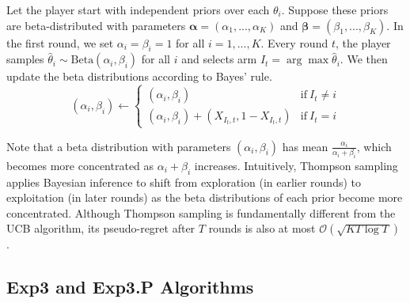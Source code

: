 \documentclass[12pt]{article}
\begin{document}
Let the player start with independent priors over each $\theta_{i}$. Suppose these priors are beta-distributed with parameters $\boldsymbol{\alpha}=(\alpha_{1}, ..., \alpha_{K})$ and $\boldsymbol{\beta}=(\beta_{1}, ..., \beta_{K})$. In the first round, we set $\alpha_{i}=\beta_{i}=1$ for all $i=1,...,K$. Every round $t$, the player samples $\hat{\theta}_{i}\sim\text{Beta}(\alpha_{i},\beta_{i})$ for all $i$ and selects arm $I_{t}=\arg\max\hat{\theta}_{i}$. We then update the beta distributions according to Bayes' rule.
\begin{equation}
(\alpha_{i}, \beta_{i})\leftarrow
\begin{cases}
(\alpha_{i},\beta_{i})&\text{if}\ I_{t}\neq i \\
(\alpha_{i},\beta_{i})+(X_{I_{t},t},1-X_{I_{t},t})&\text{if}\ I_{t}=i
\end{cases}
\end{equation}
 
Note that a beta distribution with parameters $(\alpha_{i},\beta_{i})$ has mean $\frac{\alpha_{i}}{\alpha_{i}+\beta_{i}}$, which becomes more concentrated as $\alpha_{i}+\beta_{i}$ increases. Intuitively, Thompson sampling applies Bayesian inference to shift from exploration (in earlier rounds) to exploitation (in later rounds) as the beta distributions of each prior become more concentrated. Although Thompson sampling is fundamentally different from the UCB algorithm, its pseudo-regret after $T$ rounds is also at most $\mathcal{O}(\sqrt{KT\log T})$ \cite{agrawal2012}.

\subsection{Exp3 and Exp3.P Algorithms}
\end{document}
